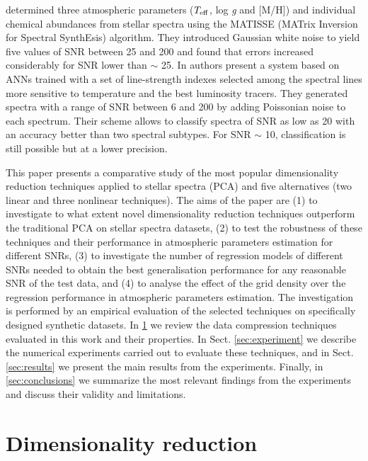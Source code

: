 \documentclass[a4paper,fleqn,usenatbib]{mnras}
\begin{document}
\cite{recio:06} determined three atmospheric parameters
($T_{\rm eff}$, log \textit{g} and [M/H]) and individual chemical
abundances from stellar spectra using the MATISSE (MATrix
Inversion for Spectral SynthEsis) algorithm. They introduced Gaussian
white noise to yield five values of SNR between 25 and 200 and found
that errors increased considerably for SNR lower than $\sim$ 25.  In
\cite{navarro:12} authors present a system based on ANNs trained with
a set of line-strength indexes selected among the spectral lines more
sensitive to temperature and the best luminosity tracers. They
generated spectra with a range of SNR between 6 and 200 by adding
Poissonian noise to each spectrum. Their scheme allows to classify
spectra of SNR as low as 20 with an accuracy better than two spectral
subtypes. For SNR $\sim$ 10, classification is still possible but at a
lower precision.

This paper presents a comparative study of the most popular
dimensionality reduction techniques applied to stellar spectra (PCA)
and five alternatives (two linear and three nonlinear techniques). The
aims of the paper are (1) to investigate to what extent novel
dimensionality reduction techniques outperform the traditional PCA on
stellar spectra datasets, (2) to test the robustness of these
techniques and their performance in atmospheric parameters estimation
for different SNRs, (3) to investigate the number of regression models
of different SNRs needed to obtain the best generalisation performance
for any reasonable SNR of the test data, and (4) to analyse the effect
of the grid density over the regression performance in atmospheric
parameters estimation.  The investigation is performed by an empirical
evaluation of the selected techniques on specifically designed
synthetic datasets. In \ref{sec:dimred} we review the data compression
techniques evaluated in this work and their properties. In
Sect. \ref{sec:experiment} we describe the numerical experiments
carried out to evaluate these techniques, and in
Sect. \ref{sec:results} we present the main results from the
experiments. Finally, in \ref{sec:conclusions} we summarize the most
relevant findings from the experiments and discuss their validity and
limitations.

\section{Dimensionality reduction}
\label{sec:dimred}
\end{document}
